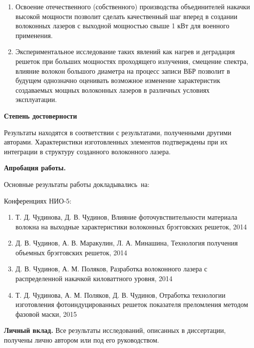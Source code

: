 \begin{enumerate}
  \item Освоение отечественного (собственного) производства объединителей накачки высокой мощности позволит сделать качественный шаг вперед в создании волоконных лазеров с выходной мощностью свыше 1 кВт для военного применения.
  \item Экспериментальное исследование таких явлений как нагрев и деградация решеток при больших мощностях проходящего излучения, смещение спектра, влияние волокон большого диаметра на процесс записи ВБР позволит в будущем однозначно оценивать возможное изменение характеристик создаваемых мощных волоконных лазеров в различных условиях эксплуатации.
\end{enumerate}

\textbf{Степень достоверности}

Результаты находятся в соответствии с результатами, полученными другими авторами. Характеристики изготовленных элементов подтверждены при их интеграции в структуру созданного волоконного лазера.

\textbf{Апробация работы.}

Основные результаты работы докладывались~на:

Конференциях НИО-5:
\begin{enumerate}
  \item Т. Д. Чудинова, Д. В. Чудинов, Влияние фоточувствительности материала волокна на выходные характеристики волоконных брэгговских решеток, 2014
  \item Д. В. Чудинов, А. В. Маракулин, Л. А. Минашина, Технология получения объемных брэгговских решеток, 2014
  \item Д. В. Чудинов, А. М. Поляков, Разработка волоконного лазера с распределенной накачкой киловаттного уровня, 2014
  \item Т. Д. Чудинова, А. М. Поляков, Д. В. Чудинов, Отработка технологии изготовления фотоиндуцированных решеток показателя преломления методом фазовой маски, 2015
\end{enumerate}


\textbf{Личный вклад.} Все результаты исследований, описанных в диссертации, получены лично автором или под его руководством.

